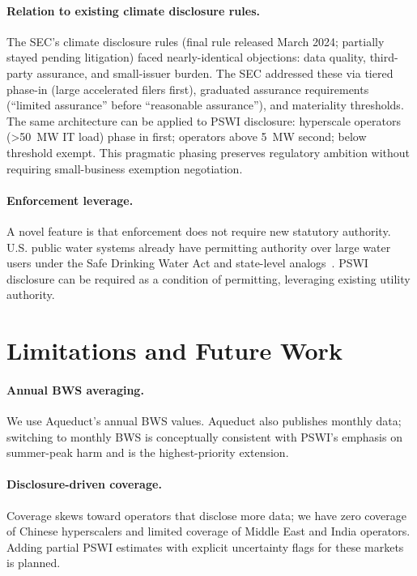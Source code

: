 \documentclass[conference,10pt]{IEEEtran}
\begin{document}
\paragraph{Relation to existing climate disclosure rules.}
The SEC's climate disclosure rules (final rule released March 2024;
partially stayed pending litigation) faced
nearly-identical objections: data quality, third-party assurance, and
small-issuer burden. The SEC addressed these via tiered phase-in
(large accelerated filers first), graduated assurance requirements
(``limited assurance'' before ``reasonable assurance''), and
materiality thresholds. The same architecture can be applied to PSWI
disclosure: hyperscale operators (>50~MW IT load) phase in first;
operators above 5~MW second; below threshold exempt. This pragmatic
phasing preserves regulatory ambition without requiring small-business
exemption negotiation.

\paragraph{Enforcement leverage.}
A novel feature is that enforcement does not require new statutory
authority. U.S. public water systems already have permitting authority
over large water users under the Safe Drinking Water Act and
state-level analogs~\cite{epa2024watercongress}. PSWI disclosure can be
required as a condition of permitting, leveraging existing utility
authority.

\section{Limitations and Future Work}
\label{sec:limitations}

\paragraph{Annual BWS averaging.}
We use Aqueduct's annual BWS values. Aqueduct also publishes monthly
data; switching to monthly BWS is conceptually consistent with PSWI's
emphasis on summer-peak harm and is the highest-priority extension.

\paragraph{Disclosure-driven coverage.}
Coverage skews toward operators that disclose more data; we have zero
coverage of Chinese hyperscalers and limited coverage of Middle East
and India operators. Adding partial PSWI estimates with explicit
uncertainty flags for these markets is planned.
\end{document}
